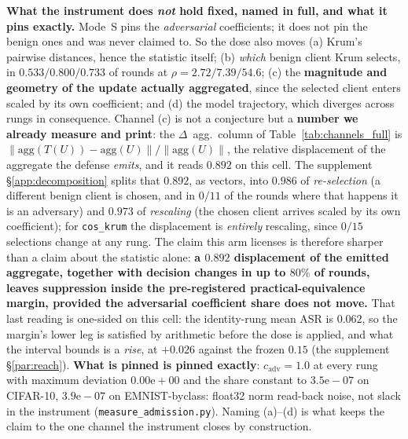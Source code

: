 \documentclass{article}
\begin{document}
\textbf{What the instrument does \emph{not} hold fixed, named in full, and what it pins exactly.} Mode~S pins the \emph{adversarial} coefficients; it does not pin the benign ones and was never claimed to. So the dose also moves (a) Krum's pairwise distances, hence the statistic itself; (b) \emph{which} benign client Krum selects, in $0.533/0.800/0.733$ of rounds at $\rho{=}2.72/7.39/54.6$; (c) the \textbf{magnitude and geometry of the update actually aggregated}, since the selected client enters scaled by its own coefficient; and (d) the model trajectory, which diverges across rungs in consequence. Channel (c) is not a conjecture but a \textbf{number we already measure and print}: the $\Delta$~agg.\ column of Table~\ref{tab:channels_full} is $\|\mathrm{agg}(T(U)) - \mathrm{agg}(U)\|/\|\mathrm{agg}(U)\|$, the relative displacement of the aggregate the defense \emph{emits}, and it reads $\mathbf{0.892}$ on this cell. The supplement §\ref{app:decomposition} splits that $0.892$, as vectors, into $0.986$ of \emph{re-selection} (a different benign client is chosen, and in $0/11$ of the rounds where that happens it is an adversary) and $0.973$ of \emph{rescaling} (the chosen client arrives scaled by its own coefficient); for \texttt{cos\_krum} the displacement is \emph{entirely} rescaling, since $0/15$ selections change at any rung. The claim this arm licenses is therefore sharper than a claim about the statistic alone: \textbf{a $0.892$ displacement of the emitted aggregate, together with decision changes in up to $80\%$ of rounds, leaves suppression inside the pre-registered practical-equivalence margin, provided the adversarial coefficient share does not move.} That last reading is one-sided on this cell: the identity-rung mean ASR is $0.062$, so the margin's lower leg is satisfied by arithmetic before the dose is applied, and what the interval bounds is a \emph{rise}, at $+0.026$ against the frozen $0.15$ (the supplement §\ref{par:reach}). \textbf{What is pinned is pinned exactly}: $c_{\mathrm{adv}}{=}1.0$ at every rung with maximum deviation $0.00\mathrm{e}{+}00$ and the share constant to $3.5\mathrm{e}{-}07$ on CIFAR-10, $3.9\mathrm{e}{-}07$ on EMNIST-byclass: float32 norm read-back noise, not slack in the instrument (\texttt{measure\_admission.py}). Naming (a)--(d) is what keeps the claim to the one channel the instrument closes by construction.

\end{document}
